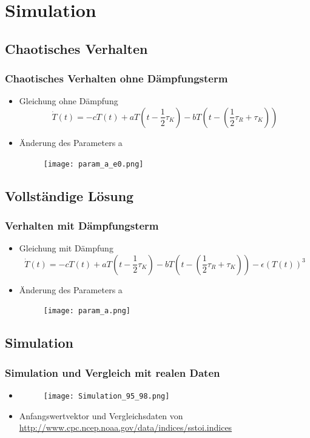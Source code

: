 \documentclass{beamer}
\begin{document}
\section{Simulation}

\subsection{Chaotisches Verhalten}
\begin{frame}
	\frametitle{Chaotisches Verhalten ohne Dämpfungsterm}
	\begin{itemize}
		\item[] Gleichung ohne Dämpfung
			\begin{equation}
				\dot{T}(t)=-cT(t)+aT(t-\frac{1}{2}\tau_K)-bT(t-(\frac{1}{2}\tau_R+\tau_K))
			\end{equation}
			\pause
		\item[] Änderung des Parameters a
			\begin{figure}
				\texttt{[image: param\_a\_e0.png]}
			\end{figure}
	\end{itemize}
\end{frame}

\subsection{Vollständige Lösung}
\begin{frame}
\frametitle{Verhalten mit Dämpfungsterm}
\begin{itemize}
	\item[] Gleichung mit Dämpfung
	\begin{equation}
	\dot{T}(t)=-cT(t)+aT(t-\frac{1}{2}\tau_K)-bT(t-(\frac{1}{2}\tau_R+\tau_K))-\epsilon(T(t))^3
	\end{equation}
	\pause
	\item[] Änderung des Parameters a
	\begin{figure}
		\texttt{[image: param\_a.png]}
	\end{figure}
\end{itemize}
\end{frame}

\subsection{Simulation}
\begin{frame}
\frametitle{Simulation und Vergleich mit realen Daten}
\begin{itemize}
	\item[] 
	\begin{figure}
		\texttt{[image: Simulation\_95\_98.png]}
	\end{figure}
	\item[] Anfangswertvektor und Vergleichsdaten von \url{http://www.cpc.ncep.noaa.gov/data/indices/sstoi.indices}
\end{itemize}
\end{frame}
\end{document}
